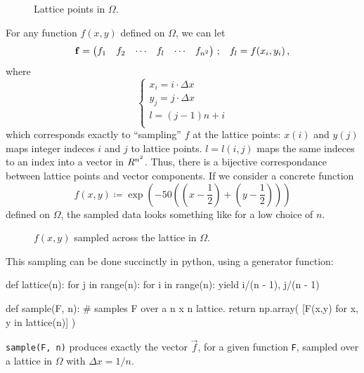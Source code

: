 \documentclass[12pt]{article}
\begin{document}
\begin{multicols}{2}
    \begin{figure}[H]
        \centering
        
        \caption{
            Lattice points in $\Omega$.
        }
        \label{fig:omega}
    \end{figure}\noindent
    For any function $f(x, y)$ defined on $\Omega$, we can let
    \[
        \vec f = \begin{pmatrix}
            f_1 & f_2 & \cdots & f_l & \cdots & f_{n^2}
        \end{pmatrix}
        \,\text; \quad
        f_l = f(x_i, y_i) \,\text,
    \]
    where
    \[
        \left\{\begin{array}{l}
            x_i = i \cdot \Delta x \\
            y_j = j \cdot \Delta x \\
            l = \left(j - 1\right)n + i \\
        \end{array}\right.
    \]
    which corresponds exactly to ``sampling'' $f$ at the lattice points:
    $x(i)$ and $y(j)$ maps integer indeces $i$ and $j$ to lattice points.
    $l = l(i,j)$ maps the same indeces to an index into a vector in $\R^{n^2}$.
    Thus, there is a bijective correspondance between lattice points
    and vector components.
    If we consider a concrete function
    \[
        f(x, y) \coloneqq \exp{\left(
            -50 \left(
                \left(x - \frac{1}{2}\right)
                + \left(y - \frac{1}{2}\right)
            \right)
        \right)}
    \]
    defined on $\Omega$, the sampled data looks something like
     for a low choice of $n$.
    \begin{figure}[H]
        \centering
        
        \caption{
            $f(x, y)$ sampled across the lattice in $\Omega$.
        }
        \label{fig:sample}
    \end{figure}\noindent
    This sampling can be done succinctly in python, using
    a generator function:
    \begin{python}[
        caption={Program to sample functions over lattices}
    ]
def lattice(n):
    for j in range(n):
        for i in range(n):
            yield i/(n - 1), j/(n - 1)

def sample(F, n):
    # samples F over a n x n lattice.
    return np.array(
        [F(x,y) for x, y in lattice(n)]
    )
    \end{python}
    {\tt sample(F, n)} produces exactly the vector $\vec f$,
    for a given function {\tt F}, sampled over a lattice
    in $\Omega$ with $\Delta x = 1/n$.


\end{multicols}
\end{document}

